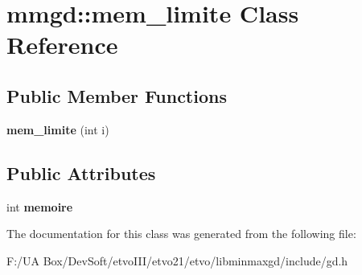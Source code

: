 \section{mmgd\+:\+:mem\+\_\+limite Class Reference}
\label{classmmgd_1_1mem__limite}
\subsection*{Public Member Functions}
\begin{DoxyCompactItemize}
\item 
\mbox{\label{classmmgd_1_1mem__limite_ab00a238d0429a5bf079c4534db8b912c}} 
{\bfseries mem\+\_\+limite} (int i)
\end{DoxyCompactItemize}
\subsection*{Public Attributes}
\begin{DoxyCompactItemize}
\item 
\mbox{\label{classmmgd_1_1mem__limite_ade5cb5c82021ac0faaf831ab83ece8ae}} 
int {\bfseries memoire}
\end{DoxyCompactItemize}


The documentation for this class was generated from the following file\+:\begin{DoxyCompactItemize}
\item 
F\+:/\+U\+A Box/\+Dev\+Soft/etvo\+I\+I\+I/etvo21/etvo/libminmaxgd/include/gd.\+h\end{DoxyCompactItemize}
